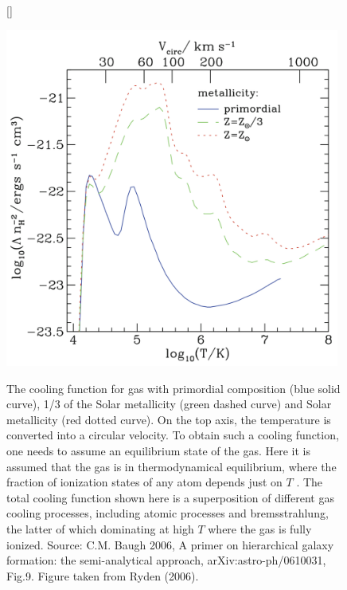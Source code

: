 \documentclass[a4paper,11pt]{article}
\begin{document}
\begin{figure}[t]
    [\FBwidth]
    {\caption{\footnotesize{The cooling function for gas with primordial composition (blue solid curve), 1/3 of the Solar metallicity (green dashed curve) and Solar metallicity (red dotted curve). On the top axis, the temperature is converted into a circular velocity. To obtain such a cooling function, one needs to assume an equilibrium state of the gas. Here it is assumed that the gas is in thermodynamical equilibrium, where the fraction of ionization states of any atom depends just on $T$ . The total cooling function shown here is a superposition of different gas cooling processes, including atomic processes and bremsstrahlung, the latter of which dominating at high $T$ where the gas is fully ionized. Source: C.M. Baugh 2006, A primer on hierarchical galaxy formation: the semi-analytical approach, arXiv:astro-ph/0610031, Fig.9. Figure taken from Ryden (2006).}}
    \label{fig:coolingfunction}}
    {\includegraphics[width=11cm]{figures/CoolingFunction.png}}
\end{figure}
\end{document}
